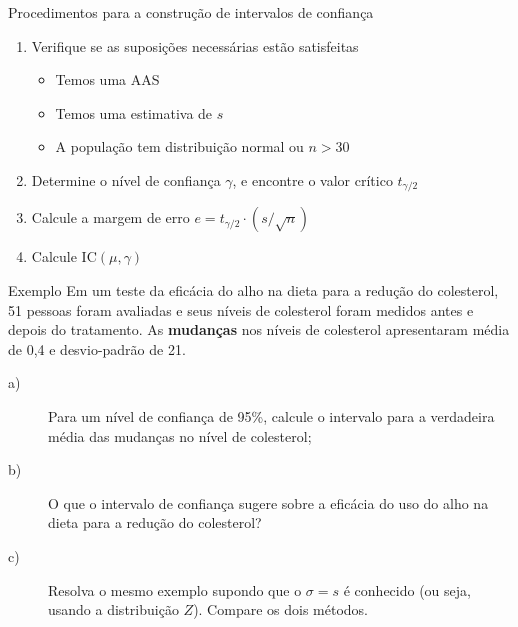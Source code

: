 \documentclass[14pt,aspectratio=1610]{beamer}
\begin{document}
	\begin{frame}{Procedimentos para a construção de intervalos de confiança}
		\begin{block}{}
			\justifying
			\begin{enumerate}
				\item Verifique se as suposições necessárias estão satisfeitas
				\begin{itemize}
					\item Temos uma AAS
					\item Temos uma estimativa de $s$
					\item A população tem distribuição normal ou $n>30$
				\end{itemize}
				
				\item Determine o nível de confiança $\gamma$, e encontre o valor crítico $t_{\gamma/2}$
				\item Calcule a margem de erro $e = t_{\gamma/2} \cdot (s/\sqrt{n})$
				\item Calcule $\text{IC}(\mu, \gamma)$
			\end{enumerate}   
		\end{block}
	\end{frame}
	
	\begin{frame}{}
		\begin{block}{Exemplo}
			\justifying
			Em um teste da eficácia do alho na dieta para a redução do colesterol, 51 pessoas foram avaliadas e seus níveis de colesterol foram medidos antes e depois do tratamento. As \textbf{mudanças} nos níveis de colesterol apresentaram média de 0,4 e desvio-padrão de
			21. 
			\begin{description}
				\item[a)~]Para um nível de confiança de 95\%, calcule o intervalo para a verdadeira média das mudanças no nível de colesterol;
				\item[b)~]O que o intervalo de confiança sugere sobre a eficácia do uso do alho na dieta para a redução do colesterol?
				\item[c)~]Resolva o mesmo exemplo supondo que o $\sigma = s$ é conhecido (ou seja, usando a distribuição $Z$). Compare os dois métodos.
			\end{description}
		\end{block}
	\end{frame}
	
\end{document}
